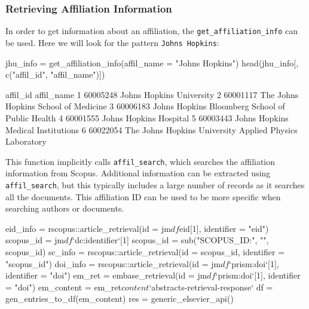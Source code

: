 \hypertarget{retrieving-affiliation-information}{%
\subsubsection{Retrieving Affiliation
Information}\label{retrieving-affiliation-information}}

In order to get information about an affiliation, the
\texttt{get\_affiliation\_info} can be used. Here we will look for the
pattern \texttt{Johns\ Hopkins}:

\begin{Schunk}
\begin{Sinput}
jhu_info = get_affiliation_info(affil_name = "Johns Hopkins")
head(jhu_info[, c("affil_id", "affil_name")])
\end{Sinput}
\begin{Soutput}
  affil_id                                              affil_name
1 60005248                                Johns Hopkins University
2 60001117                    The Johns Hopkins School of Medicine
3 60006183         Johns Hopkins Bloomberg School of Public Health
4 60001555                                  Johns Hopkins Hospital
5 60003443                      Johns Hopkins Medical Institutions
6 60022054 The Johns Hopkins University Applied Physics Laboratory
\end{Soutput}
\end{Schunk}

This function implicitly calls \texttt{affil\_search}, which searches
the affiliation information from Scopus. Additional information can be
extracted using \texttt{affil\_search}, but this typically includes a
large number of records as it searches all the documents. This
affiliation ID can be used to be more specific when searching authors or
documents.

\begin{Schunk}
\begin{Sinput}
eid_info = rscopus::article_retrieval(id = jm$df$eid[1], 
                                      identifier = "eid")
scopus_id = jm$df$`dc:identifier`[1]
scopus_id = sub("SCOPUS_ID:", "", scopus_id)
sc_info = rscopus::article_retrieval(id = scopus_id, identifier = "scopus_id")
doi_info = rscopus::article_retrieval(id = jm$df$`prism:doi`[1], identifier = "doi")
em_ret = embase_retrieval(id = jm$df$`prism:doi`[1], identifier = "doi")
em_content = em_ret$content$`abstracts-retrieval-response`
df = gen_entries_to_df(em_content)
res = generic_elsevier_api()
\end{Sinput}
\end{Schunk}


